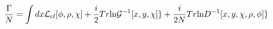 \begin{equation} \frac {\Gamma}{N}=  \int dx {\cal L}_{cl}[\phi,\rho,\chi] +
\frac{i}{2} Tr {\ln} {\cal G}^{-1} [x,y, \chi] \}+\frac{i}{2 N} Tr {\ln}
D^{-1} [x,y, \chi,\rho, \phi] \} \end{equation} 
